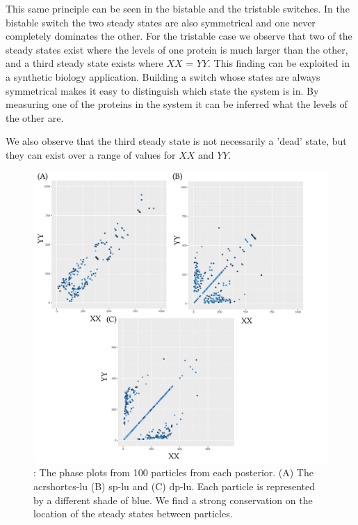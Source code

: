This same principle can be seen in the bistable and the tristable switches. In the bistable switch the two steady states are also symmetrical and one never completely dominates the other. For the tristable case we observe that two of the steady states exist where the levels of one protein is much larger than the other, and a third steady state exists where $XX$ = $YY$. This finding can be exploited in a synthetic biology application. Building a switch whose states are always symmetrical makes it easy to distinguish which state the system is in. By measuring one of the proteins in the system it can be inferred what the levels of the other are. 

We also observe that the third steady state is not necessarily a 'dead' state, but they can exist over a range of values for $XX$ and $YY$.

\begin{figure}[bp]
	\begin{center}
		\includegraphics[width=\textwidth]{../../chapters/chapterStabilityFinder/images/LU-234-phase-all.png}
		\caption[Phase plots of multistable switches]{ \label{fig:lu_234_phase}: The phase plots from 100 particles from each posterior. (A) The \\acrshort{cs-lu} (B) \acrshort{sp-lu} and (C) \acrshort{dp-lu}. Each particle is represented by a different shade of blue. We find a strong conservation on the location of the steady states between particles.  }
	\end{center}
\end{figure}


